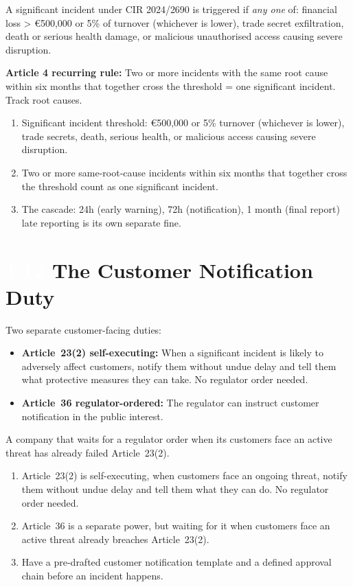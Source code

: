 \documentclass[11pt,a4paper,twoside]{book}
\newcommand{\lessontag}[1]{%
  \texorpdfstring{%
    \setlength{\fboxsep}{3pt}\colorbox{nisd2blue}{\textcolor{white}{\footnotesize\bfseries #1}}\quad%
  }{Lesson #1\ }%
}
\begin{document}
A significant incident under CIR 2024/2690 is triggered if \emph{any one} of: financial loss \textgreater{} €500,000 or 5\% of turnover (whichever is lower), trade secret exfiltration, death or serious health damage, or malicious unauthorised access causing severe disruption.

\textbf{Article 4 recurring rule:} Two or more incidents with the same root cause within six months that together cross the threshold = one significant incident. Track root causes.

\begin{keytakeaways}
\begin{enumerate}
  \item Significant incident threshold: €500,000 or 5\% turnover (whichever is lower), trade secrets, death, serious health, or malicious access causing severe disruption.
  \item Two or more same-root-cause incidents within six months that together cross the threshold count as one significant incident.
  \item The cascade: 24h (early warning), 72h (notification), 1 month (final report)  late reporting is its own separate fine.
\end{enumerate}
\end{keytakeaways}

\section{\lessontag{1.12}The Customer Notification Duty}

Two separate customer-facing duties:

\begin{itemize}
  \item \textbf{Article~23(2)  self-executing:} When a significant incident is likely to adversely affect customers, notify them without undue delay and tell them what protective measures they can take. No regulator order needed.
  \item \textbf{Article~36  regulator-ordered:} The regulator can instruct customer notification in the public interest.
\end{itemize}

A company that waits for a regulator order when its customers face an active threat has already failed Article~23(2).

\begin{keytakeaways}
\begin{enumerate}
  \item Article~23(2) is self-executing, when customers face an ongoing threat, notify them without undue delay and tell them what they can do. No regulator order needed.
  \item Article~36 is a separate power, but waiting for it when customers face an active threat already breaches Article~23(2).
  \item Have a pre-drafted customer notification template and a defined approval chain before an incident happens.
\end{enumerate}
\end{keytakeaways}
\end{document}
